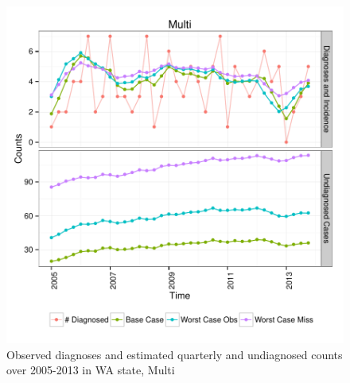 \documentclass{article}\usepackage[]{graphicx}\usepackage[]{color}
\makeatletter
\def\maxwidth{ %
  \ifdim\Gin@nat@width>\linewidth
    \linewidth
  \else
    \Gin@nat@width
  \fi
}
\newenvironment{knitrout}{}{} %
\makeatother
\begin{document}
\begin{knitrout}\footnotesize
{}\color{fgcolor}\begin{figure}[]


{\centering \includegraphics[width=\maxwidth]{figure/minimal-plot_subgroup_Multi} 

}

\caption[Observed diagnoses and estimated quarterly and undiagnosed counts over 2005-2013 in WA state, Multi]{Observed diagnoses and estimated quarterly and undiagnosed counts over 2005-2013 in WA state, Multi\label{fig:plot_subgroup_Multi}}
\end{figure}


\end{knitrout}
\end{document}
